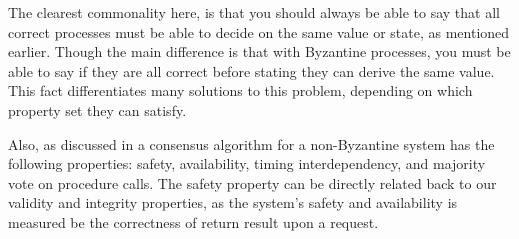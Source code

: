 The clearest commonality here, is that you should always be able to say that all correct processes must be able to decide on the same value or state, as mentioned earlier. Though the main difference is that with Byzantine processes, you must be able to say if they are all correct before stating they can derive the same value. This fact differentiates many solutions to this problem, depending on which property set they can satisfy.

Also, as discussed in \cite{Raft} a consensus algorithm for a non-Byzantine system has the following properties: safety, availability, timing interdependency, and majority vote on procedure calls. The safety property can be directly related back to our validity and integrity properties, as the system's safety and availability is measured be the correctness of return result upon a request.


